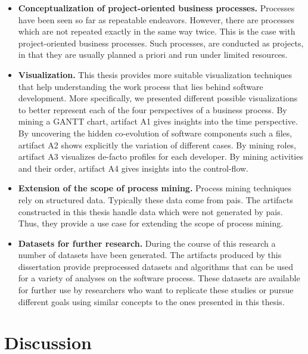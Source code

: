 \begin{itemize}
	
	\item \textbf{Conceptualization of project-oriented business processes.} Processes have been seen so far as repeatable endeavors. However, there are processes which are not repeated exactly in the same way twice. This is the case with project-oriented business processes. Such processes, are conducted as projects, in that they are usually planned a priori and run under limited resources. 
	
	\item \textbf{Visualization.} This thesis provides more suitable visualization techniques that help understanding the work process that lies behind software development. More specifically, we presented different possible visualizations to better represent each of the four perspectives of a business process. By mining a GANTT chart, artifact A1 gives insights into the time perspective. By uncovering the hidden co-evolution of software components such a files, artifact A2 shows explicitly the variation of different cases. By mining roles, artifact A3 visualizes de-facto profiles for each developer. By mining activities and their order, artifact A4 gives insights into the control-flow. 
	
	\item \textbf{Extension of the scope of process mining.} Process mining techniques rely on structured data. Typically these data come from \gls{pais}. The artifacts constructed in this thesis handle data which were not generated by \gls{pais}. Thus, they provide a use case for extending the scope of process mining. 
	
	\item \textbf{Datasets for further research.} During the course of this research a number of datasets have been generated. The artifacts produced by this dissertation provide preprocessed datasets and algorithms that can be used for a variety of analyses on the software process. These datasets are available for further use by researchers who want to replicate these studies or pursue different goals using similar concepts to the ones presented in this thesis. 
	
\end{itemize}


\section{Discussion} 
\label{sec:8-discussion}


